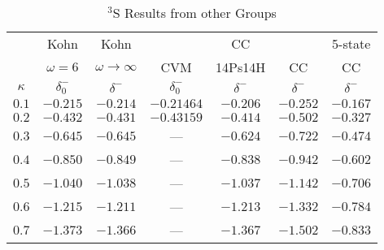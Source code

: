 \documentclass[Dissertation.tex]{subfiles}
\begin{document}

\begin{table}[H]
\centering
\begin{tabular}{c c c c c c c}
\toprule
 & Kohn & Kohn &  & CC &  & 5-state \\
 & $\omega = 6$ & $\omega \rightarrow \infty$ & CVM & 14Ps14H & CC &  CC  \\
$\kappa$ & $\delta_0^-$ \cite{VanReeth2003} & $\delta^-$ \cite{VanReeth2003} & $\delta_0^-$ \cite{Zhang2012} & $\delta^-$ \cite{Blackwood2002} & $\delta^-$ \cite{Ray1997} & $\delta^-$ \cite{Adhikari1999} \\
\midrule
$0.1$ & $-0.215$ & $-0.214$ & $-0.21464$ & $-0.206$ & $-0.252$ & $-0.167$ \\
$0.2$ & $-0.432$ & $-0.431$ & $-0.43159$ & $-0.414$ & $-0.502$ & $-0.327$ \\
$0.3$ & $-0.645$ & $-0.645$ &    ---     & $-0.624$ & $-0.722$ & $-0.474$ \\
$0.4$ & $-0.850$ & $-0.849$ &    ---     & $-0.838$ & $-0.942$ & $-0.602$ \\
$0.5$ & $-1.040$ & $-1.038$ &    ---     & $-1.037$ & $-1.142$ & $-0.706$ \\
$0.6$ & $-1.215$ & $-1.211$ &    ---     & $-1.213$ & $-1.332$ & $-0.784$ \\
$0.7$ & $-1.373$ & $-1.366$ &    ---     & $-1.367$ & $-1.502$ & $-0.833$ \\
\bottomrule
\end{tabular}
\caption{$^3$S Results from other Groups}
\label{tab:SWaveTripletOther}
\end{table}
\end{document}
